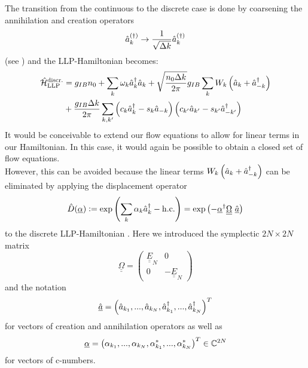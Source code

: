 The transition from the continuous to the discrete case is done by coarsening the annihilation and creation operators
\begin{equation}
\hat a_k^{\left(\dagger\right)}\rightarrow \frac1{\sqrt{\Delta k}}\hat a_k^{\left(\dagger\right)}
\end{equation}
(see \cite[eq. (7)]{PracticalTraining})
and the LLP-Hamiltonian becomes:
\begin{align}\label{ham_LLP_discrete}
\hat{\mathcal{H}}_{\mathrm{LLP}}^{\mathrm{discr.}} &=g_{IB}n_0+\sum\limits_k \omega_{ k}\hat a^\dagger_{ k}\hat a_{ k}+\sqrt{\frac{n_0\Delta k}{2\pi}}g_{IB}\sum\limits_k W_k \left(\hat a_{ k}+\hat a^\dagger_{- k}\right) \\ &+ \frac{g_{IB}\Delta k}{2\pi}\sum\limits_{k,k^\prime} \left(c_k\hat a^\dagger_k-s_k\hat a_{-k}\right)\left(c_{k^\prime}\hat a_{k^\prime}-s_{k^\prime}\hat a^\dagger_{-k^\prime}\right)\nonumber
\end{align}
It would be conceivable to extend our flow equations to allow for linear terms in our Hamiltonian. In this case, it would again be possible to obtain a closed set of flow equations. \\
However, this can be avoided because the linear terms  $W_k \left(\hat a_{ k}+\hat a^\dagger_{- k}\right)$ can be eliminated by applying the displacement operator 
\begin{equation}
\hat D(\underline\alpha)\defeq\exp\left(\sum_k\alpha_k\CR_k-\mathrm{h.c.}\right)=\exp\left(-\underline\alpha^\dagger{\underline{\underline\Omega}}\ \underline{\hat a}\right)
\end{equation}
to the discrete LLP-Hamiltonian \cite{PracticalTraining}. Here we introduced the symplectic $2N\times2N$ matrix
\begin{equation}\label{symplectic_matrix}
{\underline{\underline\Omega}}=\begin{pmatrix}\underline{\underline E}_N & 0\\ 0 & -\underline{\underline E}_N\end{pmatrix}
\end{equation}
and the notation
\begin{equation}\label{cr_an_vector}
\underline{\hat a} = \left(\hat a_{k_1},...,\hat a_{k_N},\hat a^\dagger_{k_1},...,\hat a^\dagger_{k_N}\right)^T
\end{equation}
for vectors of creation and annihilation operators as well as
\begin{equation}\label{c-number_vector}
\underline\alpha = \left(\alpha_{k_1},...,\alpha_{k_N},\alpha_{k_1}^*,...,\alpha_{k_N}^*\right)^T\in\mathbb{C}^{2N}
\end{equation}
for vectors of c-numbers. \par %
